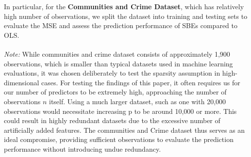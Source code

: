 \begin{enumerate}
    In particular, for the \textbf{Communities and Crime Dataset}, which has relatively high number of observations, we split the dataset into training and testing sets to evaluate the MSE and assess the prediction performance of SBEs compared to OLS.\\
    \\
    \textit{Note:} While communities and crime dataset consists of approximately 1,900 observations, which is smaller than typical datasets used in machine learning evaluations, it was chosen deliberately to test the sparsity assumption in high-dimensional cases. For testing the findings of this paper, it often requires us for our number of predictors to be extremely high, approaching the number of observations $n$ itself. Using a much larger dataset, such as one with 20,000 observations would necessitate increasing p to be around 10,000 or more. This could result in highly redundant datasets due to the excessive number of artificially added features. The communities and Crime dataset thus serves as an ideal compromise, providing sufficient observations to evaluate the prediction performance without introducing undue redundancy.
        
\end{enumerate}
